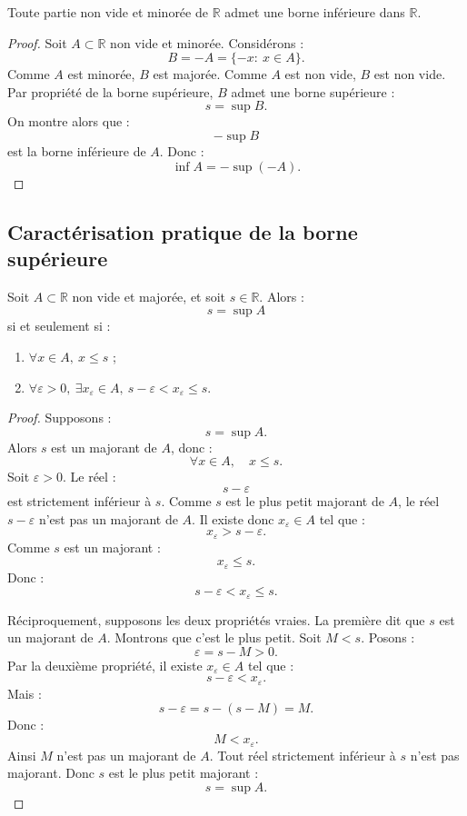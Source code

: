 \documentclass[11pt,a4paper]{article}
\newcommand{\R}{\mathbb R}
\begin{document}
\begin{theorembox}
Toute partie non vide et minorée de \(\R\) admet une borne inférieure dans \(\R\).
\end{theorembox}

\begin{proof}
Soit \(A\subset\R\) non vide et minorée.  
Considérons :
\[
B=-A=\{-x:\ x\in A\}.
\]
Comme \(A\) est minorée, \(B\) est majorée.  
Comme \(A\) est non vide, \(B\) est non vide.  
Par propriété de la borne supérieure, \(B\) admet une borne supérieure :
\[
s=\sup B.
\]
On montre alors que :
\[
-\sup B
\]
est la borne inférieure de \(A\).  
Donc :
\[
\inf A=-\sup(-A).
\]
\end{proof}

\subsection{Caractérisation pratique de la borne supérieure}

\begin{theorembox}
Soit \(A\subset\R\) non vide et majorée, et soit \(s\in\R\).  
Alors :
\[
s=\sup A
\]
si et seulement si :
\begin{enumerate}
    \item \(\forall x\in A,\ x\leq s\) ;
    \item \(\forall \varepsilon>0,\ \exists x_\varepsilon\in A,\ s-\varepsilon<x_\varepsilon\leq s.\)
\end{enumerate}
\end{theorembox}

\begin{proof}
Supposons :
\[
s=\sup A.
\]
Alors \(s\) est un majorant de \(A\), donc :
\[
\forall x\in A,\quad x\leq s.
\]
Soit \(\varepsilon>0\).  
Le réel :
\[
s-\varepsilon
\]
est strictement inférieur à \(s\).  
Comme \(s\) est le plus petit majorant de \(A\), le réel \(s-\varepsilon\) n'est pas un majorant de \(A\).  
Il existe donc \(x_\varepsilon\in A\) tel que :
\[
x_\varepsilon>s-\varepsilon.
\]
Comme \(s\) est un majorant :
\[
x_\varepsilon\leq s.
\]
Donc :
\[
s-\varepsilon<x_\varepsilon\leq s.
\]

Réciproquement, supposons les deux propriétés vraies.  
La première dit que \(s\) est un majorant de \(A\).  
Montrons que c'est le plus petit.  
Soit \(M<s\).  
Posons :
\[
\varepsilon=s-M>0.
\]
Par la deuxième propriété, il existe \(x_\varepsilon\in A\) tel que :
\[
s-\varepsilon<x_\varepsilon.
\]
Mais :
\[
s-\varepsilon=s-(s-M)=M.
\]
Donc :
\[
M<x_\varepsilon.
\]
Ainsi \(M\) n'est pas un majorant de \(A\).  
Tout réel strictement inférieur à \(s\) n'est pas majorant.  
Donc \(s\) est le plus petit majorant :
\[
s=\sup A.
\]
\end{proof}
\end{document}
